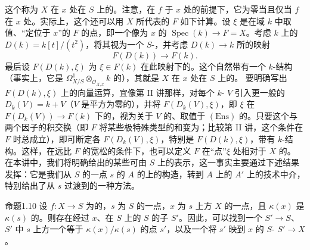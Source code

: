 这个称为 $X$ 在 $x$ 处在 $S$ 上的。注意，在 $f$ 于 $x$ 处的前提下，它为零当且仅当 $f$ 在 $x$ 处。实际上，这个还可以用 $X$ 所代表的 $F$ 如下计算。设 $\xi$ 是在域 $k$ 中取值、“定位于 $x$”的 $F$ 的点，即一个像为 $x$ 的 $\operatorname{Spec}(k)\to F=X$。考虑 $k$ 上的 $D(k)=k[t]/(t^2)$，将其视为一个 $S$-，并考虑 $D(k)\to k$ 所的映射
\[F(D(k))\longrightarrow F(k).\]
最后设 $F(D(k),\xi)$ 为 $\xi\in F(k)$ 在此映射下的。这个自然带有一个 $k$-结构（事实上，它是 $\Omega^1_{X/S}\otimes_{\mathscr O_{X,x}}k$ 的），其就是 $X$ 在 $x$ 处在 $S$ 上的。
要明确写出 $F(D(k),\xi)$ 上的向量运算，宜像第 II 讲那样，对每个 $k$- $V$ 引入更一般的 $D_k(V)=k+V$（$V$ 是平方为零的），并将 $F(D_k(V),\xi)$，即 $\xi$ 在 $F(D_k(V))\to F(k)$ 下的，视为关于 $V$ 的、取值于 $(\mathrm{Ens})$ 的。只要这个与两个因子的积交换（即 $F$ 将某些极特殊类型的和变为；比较第 II 讲，这个条件在 $F$ 时总成立），即可断定各 $F(D_k(V),\xi)$，特别是 $F(D(k),\xi)$，带有 $k$-结构。这样，在远比 $F$ 的宽松的条件下，也可以定义 $F$ 在“点”$\xi$ 处相对于 $X$ 的。
在本讲中，我们将明确给出的某些可由 $S$ 上的表示，这一事实主要通过下述结果发挥：它是我们从 $S$ 的一点 $s$ 的 $A$ 的上的构造，转到 $A$ 上的 $A'$ 上的技术中介，特别给出了从 $s$ 过渡到的一种方法。
\begin{SGAresult}{命题}{1.10}
设 $f:X\to S$ 为的，$s$ 为 $S$ 的一点，$x$ 为 $s$ 上方 $X$ 的一点，且 $\kappa(x)$ 是 $\kappa(s)$ 的。则存在经过 $x$、在 $S$ 上的 $S$ 的子 $S'$。因此，可以找到一个 $S'\to S$、$S'$ 中 $s$ 上方一个等于 $\kappa(x)/\kappa(s)$ 的点 $s'$，以及一个将 $s'$ 映到 $x$ 的 $S$- $S'\to X$。
\end{SGAresult}
